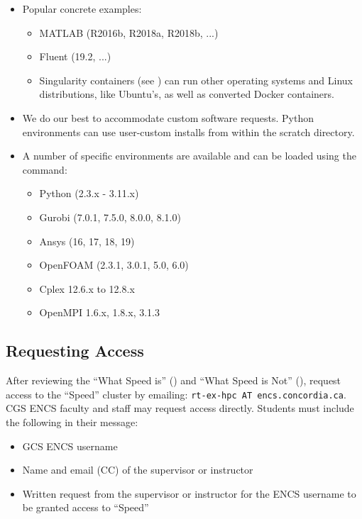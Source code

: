 \documentclass{easychair}
\begin{document}
\begin{itemize}
	\item 
Popular concrete examples:
\begin{itemize}
	\item 
MATLAB (R2016b, R2018a, R2018b, ...)
	\item 
Fluent (19.2, ...)
	\item 
Singularity containers (see ) can run other 
operating systems and Linux distributions, like Ubuntu's, as well as 
converted Docker containers.
\end{itemize}
	\item 
We do our best to accommodate custom software requests.
Python environments can use user-custom installs 
from within the scratch directory.
	\item 
A number of specific environments are available and 
can be loaded using the  command:
\begin{itemize}
	\item 
Python (2.3.x - 3.11.x)
	\item 
Gurobi (7.0.1, 7.5.0, 8.0.0, 8.1.0)
	\item 
Ansys (16, 17, 18, 19)
	\item 
OpenFOAM (2.3.1, 3.0.1, 5.0, 6.0)
	\item 
Cplex 12.6.x to 12.8.x
	\item 
OpenMPI 1.6.x, 1.8.x, 3.1.3
\end{itemize}
\end{itemize}

\subsection{Requesting Access}
\label{sect:access}

After reviewing the ``What Speed is'' () and
``What Speed is Not'' (), request access to the ``Speed'' 
cluster by emailing: \texttt{rt-ex-hpc AT encs.concordia.ca}.
%
CGS ENCS faculty and staff may request access directly.
Students must include the following in their message:

\begin{itemize} 
	\item GCS ENCS username
	\item Name and email (CC) of the supervisor or instructor
	\item Written request from the supervisor or instructor for the ENCS username to be granted access to ``Speed''
\end{itemize}
\end{document}

